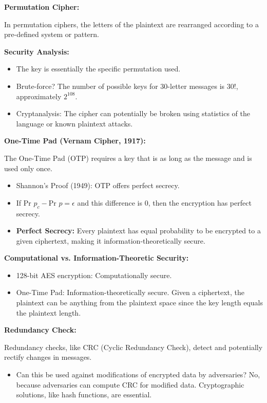 \documentclass[12pt]{article}
\begin{document}
\noindent\textbf{Permutation Cipher:}

In permutation ciphers, the letters of the plaintext are rearranged according to a pre-defined system or pattern.

\textbf{Security Analysis:}
\begin{itemize}
    \item The key is essentially the specific permutation used.
    \item Brute-force? The number of possible keys for 30-letter messages is \( 30! \), approximately \( 2^{108} \).
    \item Cryptanalysis: The cipher can potentially be broken using statistics of the language or known plaintext attacks.
\end{itemize}

\noindent\textbf{One-Time Pad (Vernam Cipher, 1917):}

The One-Time Pad (OTP) requires a key that is as long as the message and is used only once.

\begin{itemize}
    \item Shannon's Proof (1949): OTP offers perfect secrecy.
    \item If \( \text{Pr } p_c - \text{Pr } p = \epsilon \) and this difference is 0, then the encryption has perfect secrecy.
    \item \textbf{Perfect Secrecy:} Every plaintext has equal probability to be encrypted to a given ciphertext, making it information-theoretically secure.
\end{itemize}

\noindent\textbf{Computational vs. Information-Theoretic Security:}

\begin{itemize}
    \item 128-bit AES encryption: Computationally secure.
    \item One-Time Pad: Information-theoretically secure. Given a ciphertext, the plaintext can be anything from the plaintext space since the key length equals the plaintext length.
\end{itemize}

\noindent\textbf{Redundancy Check:}

Redundancy checks, like CRC (Cyclic Redundancy Check), detect and potentially rectify changes in messages.

\begin{itemize}
    \item Can this be used against modifications of encrypted data by adversaries? No, because adversaries can compute CRC for modified data. Cryptographic solutions, like hash functions, are essential.
\end{itemize}
\end{document}
